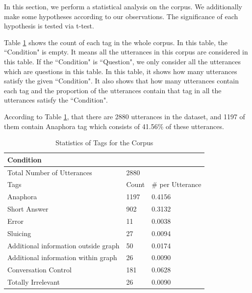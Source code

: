 \documentclass[bsc,frontabs,twoside,singlespacing,parskip,deptreport]{infthesis}     %
\begin{document}
In this section, we perform a statistical analysis on the corpus. We additionally make some hypotheses according to our observations. The significance of each hypothesis is tested via t-test.

Table \ref{tab:ori} shows the count of each tag in the whole corpus. In this table, the ``Condition" is empty. It means all the utterances in this corpus are considered in this table. If the ``Condition" is ``Question", we only consider all the utterances which are questions in this table. In this table, it shows how many utterances satisfy the given ``Condition". It also shows that how many utterances contain each tag and the proportion of the utterances contain that tag in all the utterances satisfy the ``Condition". 

According to Table \ref{tab:ori}, that there are 2880 utterances in the dataset, and 1197 of them contain Anaphora tag which consists of 41.56\% of these utterances.

\begin{table}[]
\centering
\begin{tabular}{|l|l|l|}
\hline
Condition                            & \multicolumn{2}{l|}{}            \\ \hline
Total Number of Utterances           & \multicolumn{2}{l|}{2880}        \\ \hline
Tags                                 & Count & \# per Utterance \\ \hline
Anaphora                             & 1197  & 0.4156                   \\ \hline
Short Answer                         & 902   & 0.3132                   \\ \hline
Error                                & 11    & 0.0038                   \\ \hline
Sluicing                             & 27    & 0.0094                   \\ \hline
Additional information outside graph & 50    & 0.0174                   \\ \hline
Additional information within graph  & 26    & 0.0090                   \\ \hline
Conversation Control                 & 181   & 0.0628                   \\ \hline
Totally Irrelevant                   & 26    & 0.0090                   \\ \hline
\end{tabular}
\caption{Statistics of Tags for the Corpus }
\label{tab:ori}
\end{table}
\end{document}
